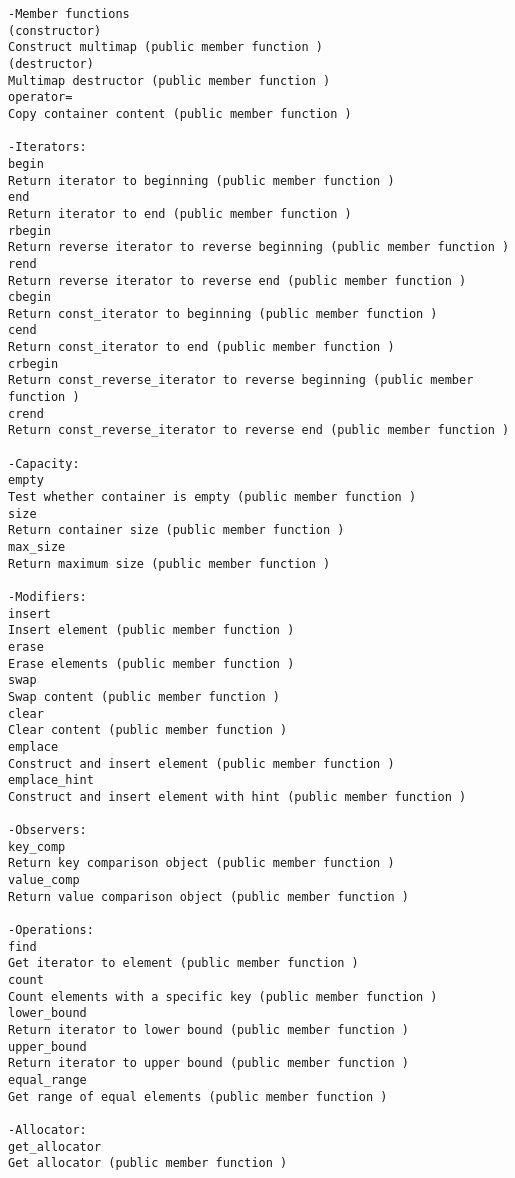 \begin{verbatim}
-Member functions
(constructor)
Construct multimap (public member function )
(destructor)
Multimap destructor (public member function )
operator=
Copy container content (public member function )

-Iterators:
begin
Return iterator to beginning (public member function )
end
Return iterator to end (public member function )
rbegin
Return reverse iterator to reverse beginning (public member function )
rend
Return reverse iterator to reverse end (public member function )
cbegin 
Return const_iterator to beginning (public member function )
cend 
Return const_iterator to end (public member function )
crbegin 
Return const_reverse_iterator to reverse beginning (public member function )
crend 
Return const_reverse_iterator to reverse end (public member function )

-Capacity:
empty
Test whether container is empty (public member function )
size
Return container size (public member function )
max_size
Return maximum size (public member function )

-Modifiers:
insert
Insert element (public member function )
erase
Erase elements (public member function )
swap
Swap content (public member function )
clear
Clear content (public member function )
emplace 
Construct and insert element (public member function )
emplace_hint 
Construct and insert element with hint (public member function )

-Observers:
key_comp
Return key comparison object (public member function )
value_comp
Return value comparison object (public member function )

-Operations:
find
Get iterator to element (public member function )
count
Count elements with a specific key (public member function )
lower_bound
Return iterator to lower bound (public member function )
upper_bound
Return iterator to upper bound (public member function )
equal_range
Get range of equal elements (public member function )

-Allocator:
get_allocator
Get allocator (public member function )
\end{verbatim}